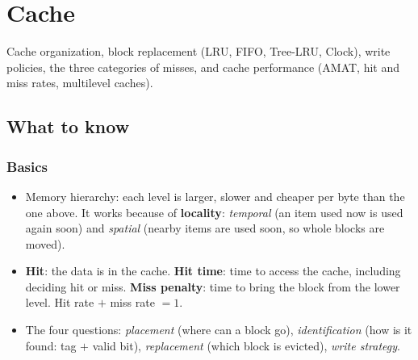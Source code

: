 \section{Cache}
\label{sec:cache}

Cache organization, block replacement (LRU, FIFO, Tree-LRU, Clock), write
policies, the three categories of misses, and cache performance (AMAT, hit and miss
rates, multilevel caches).

\subsection{What to know}

\subsubsection{Basics}
\begin{itemize}[leftmargin=*]
  \item Memory hierarchy: each level is larger, slower and cheaper per byte than
  the one above. It works because of \textbf{locality}: \emph{temporal} (an item
  used now is used again soon) and \emph{spatial} (nearby items are used soon, so
  whole blocks are moved).
  \item \textbf{Hit}: the data is in the cache. \textbf{Hit time}: time to access
  the cache, including deciding hit or miss. \textbf{Miss penalty}: time to bring
  the block from the lower level. Hit rate $+$ miss rate $=1$.
  \item The four questions: \emph{placement} (where can a block go),
  \emph{identification} (how is it found: tag $+$ valid bit), \emph{replacement}
  (which block is evicted), \emph{write strategy}.
\end{itemize}

